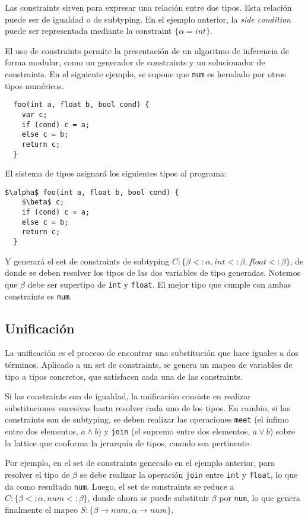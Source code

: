 Las constraints sirven para expresar una relación entre dos tipos. Esta relación puede ser de igualdad o de subtyping. En el ejemplo anterior, la \textit{side condition} puede ser representada mediante la constraint $\{\alpha = int\}$.

El uso de constraints permite la presentación de un algoritmo de inferencia de forma modular, como un generador de constraints y un solucionador de constraints. En el siguiente ejemplo, se supone que \texttt{num} es heredado por otros tipos numéricos.

\begin{lstlisting}
  foo(int a, float b, bool cond) {
    var c;
    if (cond) c = a;
    else c = b;
    return c;
  }
\end{lstlisting}

El sistema de tipos asignará los siguientes tipos al programa:
\begin{lstlisting}[mathescape=true]
  $\alpha$ foo(int a, float b, bool cond) {
    $\beta$ c;
    if (cond) c = a;
    else c = b;
    return c;
  }
\end{lstlisting}
Y generará el set de constraints de subtyping $C: \{\beta <: \alpha, int <: \beta, float <: \beta\}$, de donde se deben resolver los tipos de las dos variables de tipo generadas. Notemos que $\beta$ debe ser supertipo de \texttt{int} y \texttt{float}. El mejor tipo que cumple con ambas constraints es \texttt{num}.
\subsection{Unificación}
La unificación es el proceso de encontrar una substitución que hace iguales a dos términos. Aplicado a un set de constraints, se genera un mapeo de variables de tipo a tipos concretos, que satisfacen cada una de las constraints.

Si las constraints son de igualdad, la unificación consiste en realizar substituciones sucesivas hasta resolver cada uno de los tipos. En cambio, si las constraints son de subtyping, se deben realizar las operaciones \texttt{meet} (el ínfimo entre dos elementos, $a \wedge b$) y \texttt{join} (el supremo entre dos elementos, $a \vee b$) sobre la lattice que conforma la jerarquía de tipos, cuando sea pertinente.

Por ejemplo, en el set de constraints generado en el ejemplo anterior, para resolver el tipo de $\beta$ se debe realizar la operación \texttt{join} entre \texttt{int} y \texttt{float}, lo que da como resultado \texttt{num}. Luego, el set de constraints se reduce a $C: \{\beta <: \alpha, num <: \beta\}$, donde ahora se puede substituir $\beta$ por \texttt{num}, lo que genera finalmente el mapeo $S: \{\beta \rightarrow num, \alpha \rightarrow num\}$.
